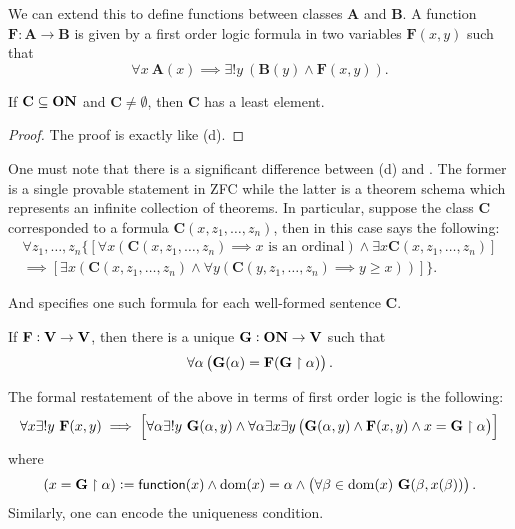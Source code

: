 We can extend this to define functions between classes $\mathbf A$ and $\mathbf B$. A function $\mathbf F:\mathbf A\to\mathbf B$ is given by a first order logic formula in two variables $\mathbf F(x,y)$ such that 
\begin{equation*}
    \forall x~\mathbf A(x)\implies\exists!y~\left(\mathbf B(y)\wedge\mathbf F(x,y)\right).
\end{equation*}

\begin{theorem}
    If $\mathbf C\subseteq\mathbf{ON}$ and $\mathbf C\ne\emptyset$, then $\mathbf C$ has a least element.
\end{theorem}
\begin{proof}
    The proof is exactly like  (d).
\end{proof}

One must note that there is a significant difference between  (d) and . The former is a single provable statement in \textsf{ZFC} while the latter is a theorem schema which represents an infinite collection of theorems. In particular, suppose the class $\mathbf C$ corresponded to a formula $\mathbf C(x,z_1,\dots,z_n)$, then  in this case says the following: 
\begin{align*}
    \forall z_1,\dots,z_n\big\{\left[\forall x(\mathbf C(x,z_1,\dots,z_n)\implies x\text{ is an ordinal})\wedge\exists x\mathbf C(x,z_1,\dots,z_n)\right]\\
    \implies\left[\exists x\left(\mathbf C(x,z_1,\dots,z_n)\wedge\forall y(\mathbf C(y,z_1,\dots,z_n)\implies y\ge x)\right)\right]\big\}.
\end{align*}

And  specifies one such formula for each well-formed sentence $\mathbf C$.

\begin{theorem}
    If $\mathbf F: \mathbf{V}\to\mathbf{V}$, then there is a unique $\mathbf G:\mathbf{ON}\to\mathbf{V}$ such that 
    \begin{equation*}
        \forall\alpha\left(\mathbf G(\alpha) = \mathbf F(\mathbf G\upharpoonright\alpha)\right).
    \end{equation*}
\end{theorem}
The formal restatement of the above in terms of first order logic is the following: 
\begin{equation*}
    \forall x\exists!y~\mathbf F(x,y)\implies\left[\forall\alpha\exists!y~\mathbf G(\alpha, y)\wedge\forall\alpha\exists x\exists y\left(\mathbf G(\alpha, y)\wedge\mathbf F(x,y)\wedge x = \mathbf G\upharpoonright\alpha\right)\right]
\end{equation*}
where 
\begin{equation*}
    (x = \mathbf G\upharpoonright\alpha) := \mathsf{function}(x)\wedge\operatorname{dom}(x) = \alpha\wedge\left(\forall\beta\in\operatorname{dom}(x)~\mathbf G(\beta,x(\beta))\right).
\end{equation*}
Similarly, one can encode the uniqueness condition.

